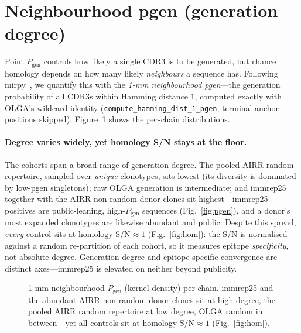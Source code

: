 \section{Neighbourhood pgen (generation degree)}\label{sec:degree}

Point $P_{\text{gen}}$ controls how likely a single CDR3 is to be generated, but chance
homology depends on how many likely \emph{neighbours} a sequence has. Following
mirpy~\cite{mirpy}, we quantify this with the \emph{1-mm neighbourhood pgen}---the
generation probability of all CDR3s within Hamming distance $1$, computed exactly with
OLGA's wildcard identity (\texttt{compute\_hamming\_dist\_1\_pgen}; terminal anchor
positions skipped). Figure~\ref{fig:pgen1mm} shows the per-chain distributions.

\paragraph{Degree varies widely, yet homology S/N stays at the floor.} The cohorts span
a broad range of generation degree. The pooled AIRR random repertoire, sampled over
\emph{unique} clonotypes, sits lowest (its diversity is dominated by low-pgen singletons);
raw OLGA generation is intermediate; and immrep25 together with the AIRR non-random donor
clones sit highest---immrep25 positives are public-leaning, high-$P_{\text{gen}}$
sequences (Fig.~\ref{fig:pgen}), and a donor's most expanded clonotypes are likewise
abundant and public. Despite this spread, \emph{every} control sits at homology
S/N${\approx}1$ (Fig.~\ref{fig:hom}): the S/N is normalised against a random re-partition
of each cohort, so it measures epitope \emph{specificity}, not absolute degree.
Generation degree and epitope-specific convergence are distinct axes---immrep25 is
elevated on neither beyond publicity.

\begin{figure}[h]\centering

\caption{1-mm neighbourhood $P_{\text{gen}}$ (kernel density) per chain. immrep25 and the
abundant AIRR non-random donor clones sit at high degree, the pooled AIRR random
repertoire at low degree, OLGA random in between---yet all controls sit at homology
S/N${\approx}1$ (Fig.~\ref{fig:hom}).}
\label{fig:pgen1mm}
\end{figure}
